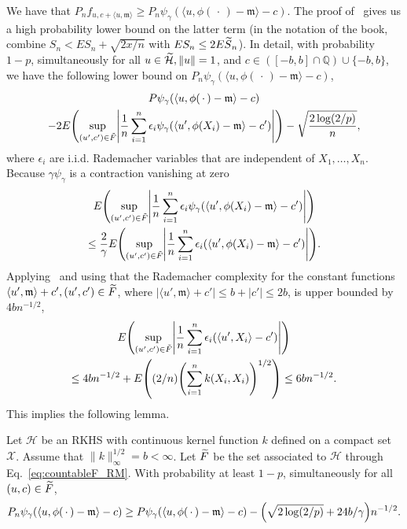 \documentclass[AHL,Unicode,longabstracts,published]{cedram}
\theoremstyle{remark}
\newcommand{\bbQ}{\mathbb{Q}}
\newcommand{\X}{\mathcal{X}}
\newcommand{\cH}{\mathcal{H}}
\newcommand{\mean}{\mathfrak{m}}
\newcommand*{\MK}{\mkern 2mu}
\let\oldtilde\tilde
\renewcommand*{\tilde}[1]{\mathchoice{\widetilde{#1}}{\widetilde{#1}}{\oldtilde{#1}}{\oldtilde{#1}}}
\let\originalleft\left
\let\originalright\right
\renewcommand{\left}{\mathopen{}\mathclose\bgroup\originalleft}
\renewcommand{\right}{\aftergroup\egroup\originalright}
\begin{document}
We have that $P_n f_{u,c + \langle u,\mean \rangle} \geq P_n
\psi_\gamma(\langle u, \phi(\,\cdot\,) - \mean \rangle -c)$. The proof of~\cite[Theorem~3.4.5]{GINE15} gives us a high probability lower bound on the latter term (in the notation of the book, combine $S_n < E S_n + \sqrt{2x/n}$ with $ES_n \leq 2 E\tilde S_n$). In detail, with probability $1-p$, simultaneously for all $u \in \tilde \cH, \|u\| = 1$, and $c \in ([-b,b] \cap \bbQ)
\cup \{-b,b\}$, we have the following lower bound on $P_n \psi_\gamma(\langle u, \phi(\,\cdot\,) - \mean \rangle -c)$,
\begin{multline*}
P \psi_\gamma(\langle u, \phi(\,\cdot\,) - \mean \rangle -c)\\
- 2 E\left(\sup_{(u',c') \in \tilde{F}} \left| \frac{1}{n} \sum_{i=1}^n \epsilon_i \psi_\gamma(\langle u', \phi(X_i) - \mean \rangle -c') \right|\right) - \sqrt{\frac{2 \log(2/p)}{n}},
\end{multline*}
where $\epsilon_i$ are i.i.d. Rademacher variables that are independent of $X_1,\dots, X_n$. Because $\gamma \psi_\gamma$ is a contraction vanishing at zero
\begin{multline*}
E\left(\sup_{(u',c') \in \tilde F} \left| \frac{1}{n} \sum_{i=1}^n \epsilon_i \psi_\gamma(\langle u', \phi(X_i) - \mean \rangle -c') \right|\right)\\
\leq \frac{2}{\gamma} E\left(\sup_{(u',c') \in \tilde{F}} \left| \frac{1}{n} \sum_{i=1}^n \epsilon_i (\langle u', \phi(X_i) - \mean \rangle -c') \right|\right).
\end{multline*}
Applying~\cite[Theorem~12$\MK$(7) and Lemma~22]{BART02} and using that the Rademacher complexity for the constant functions $\langle u', \mean \rangle + c', (u',c') \in \tilde F$, where $|\langle u', \mean\rangle + c'| \leq b + |c'| \leq 2 b$, is upper bounded by $4b n^{-1/2}$,
\begin{multline*}
E\left(\sup_{(u',c') \in \tilde F} \left| \frac{1}{n} \sum_{i=1}^n \epsilon_i (\langle u', X_i \rangle -c') \right|\right)\\ \leq 4b n^{-1/2} + E\left((2/n)\left(\sum_{i=1}^n k(X_i, X_i)\right)^{1/2} \right) \leq 6 bn^{-1/2}.
\end{multline*}
This implies the following lemma.

\begin{lemm}\label{lem:conc_RM}
Let $\cH$ be an RKHS with continuous kernel function $k$ defined on a compact set $\X$. Assume that $\|k\|_\infty^{1/2} = b < \infty$. Let $\tilde{F}$ be the set associated to $\cH$ through Eq.~\eqref{eq:countableF_RM}. With probability at least $1-p$, simultaneously for all $(u,c) \in \tilde F$,
\[
P_n \psi_\gamma(\langle u, \phi(\,\cdot\,) - \mean \rangle -c) \geq P \psi_\gamma(\langle u, \phi(\,\cdot\,) - \mean \rangle -c) - \left(\sqrt{2\log(2/p)} + 24b/\gamma\right) n^{-1/2}.
\]
\end{lemm}
\end{document}
